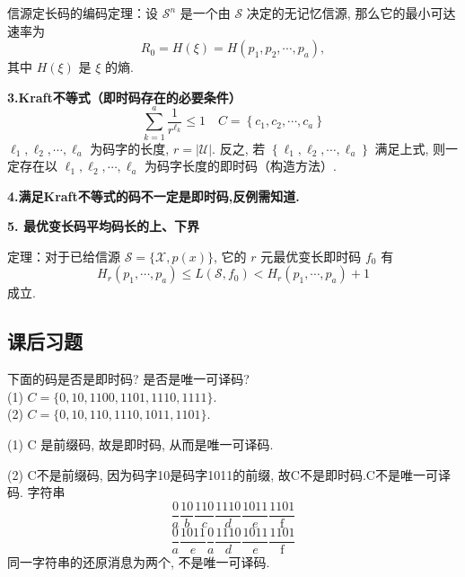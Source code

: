 信源定长码的编码定理：设 $ \mathscr{S}^{n} $ 是一个由 $ \mathscr{S} $ 决定的无记忆信源, 那么它的最小可达速率为
$$
R_{0}=H(\xi)=H\left(p_{1}, p_{2}, \cdots, p_{a}\right),
$$
其中 $ H(\xi) $ 是 $ \xi $ 的熵.

\textbf{3.Kraft不等式（即时码存在的必要条件）}
$$
\sum_{k=1}^{a} \frac{1}{r^{\ell_{k}}} \leq 1 \quad C=\left\{c_{1}, c_{2}, \cdots, c_{a}\right\}
$$
$ \ell_{1}, \ell_{2}, \cdots, \ell_{a} $ 为码字的长度, $ r=|\mathscr{U}| $.
反之, 若 $ \left\{\ell_{1}, \ell_{2}, \cdots, \ell_{a}\right\} $ 满足上式, 则一定存在以 $ \ell_{1}, \ell_{2}, \cdots, \ell_{a} $ 为码字长度的即时码（构造方法）.

\textbf{4.满足Kraft不等式的码不一定是即时码,反例需知道.}

\textbf{5. 最优变长码平均码长的上、下界}

定理：对于已给信源 $ \mathscr{S}=\{\mathscr{X}, p(x)\} $, 它的 $ r $ 元最优变长即时码 $ f_{0} $ 有
$$
H_{r}\left(p_{1}, \cdots, p_{a}\right) \leq L\left(\mathscr{S}, f_{0}\right)<H_{r}\left(p_{1}, \cdots, p_{a}\right)+1
$$
成立.

\subsection{课后习题}
\begin{exercise}
下面的码是否是即时码? 是否是唯一可译码?\\
(1) $ C=\{0,10,1100,1101,1110,1111\} $.\\
(2) $ C=\{0,10,110,1110,1011,1101\} $.
\end{exercise}
\begin{solution}
 (1) C 是前缀码, 故是即时码, 从而是唯一可译码.
 
(2) C不是前缀码, 因为码字10是码字1011的前缀, 故C不是即时码.C不是唯一可译码.
字符串
$$
\frac{0}{a} \frac{10}{b} \frac{110}{c} \frac{1110}{d} \frac{1011}{e} \frac{1101}{\mathrm{f}} $$
$$
\frac{0}{a} \frac{1011}{e} \frac{0}{a} \frac{1110}{d} \frac{1011}{e} \frac{1101}{\mathrm{f}}
$$
同一字符串的还原消息为两个, 不是唯一可译码.
\end{solution}


